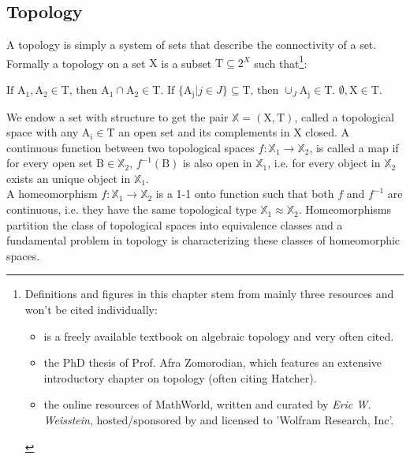 \subsection{Topology}
\label{math_topology}

A topology is simply a system of sets that describe the connectivity of a set.
Formally a topology on a set $\mathrm{X}$ is a subset $\mathrm{T} \subseteq 2^{X}$ such that\footnote{ Definitions and figures in this chapter stem from mainly three resources and won't be cited individually:\begin{itemize}
\item \citep[][]{Hatcher2002} is a freely available textbook on algebraic topology and very often cited.
\item \citep[][]{Zomorodian1996} the PhD thesis of Prof. Afra Zomorodian, which features an extensive introductory chapter on topology (often citing Hatcher).
\item \citep[][]{Weisstein2002} the online resources of MathWorld, written and curated by \textit{Eric W. Weisstein}, hosted/sponsored by and licensed to 'Wolfram Research, Inc'.\end{itemize}}:
\begin{enumerate} \setlength{\itemsep}{0cm} \setlength{\parskip}{0cm}
	\Item $\text{If } \mathrm{A_{1}}, \mathrm{A_{2}} \in \mathrm{T} \text{, then } \mathrm{A_{1}} \cap \mathrm{A_{2}} \in \mathrm{T}.$
	\Item $\text{If } \{\mathrm{A_{j}} | j \in J\} \subseteq \mathrm{T} \text{, then } \cup_{J} \mathrm{A_{j}} \in \mathrm{T}.$
	\Item $\emptyset, \mathrm{X} \in \mathrm{T}.$
\end{enumerate}
We endow a set with structure to get the pair $\mathbb{X} = (\mathrm{X},\mathrm{T})$, called a topological space with any $\mathrm{A}_{i} \in \mathrm{T}$ an open set and its complements in $\mathrm{X}$ closed.
A continuous function between two topological spaces $f: \mathbb{X}_{1} \rightarrow \mathbb{X}_{2}$, is called a map if for every open set $\mathrm{B} \in \mathbb{X}_{2}$, $f^{-1}(\mathrm{B})$ is also open in $\mathbb{X}_{1}$, i.e. for every object in $\mathbb{X}_{2}$ exists an unique object in $\mathbb{X}_{1}$.\\
A homeomorphism $f: \mathbb{X}_{1} \rightarrow \mathbb{X}_{2}$ is a 1-1 onto function such that both $f$ and $f^{-1}$ are continuous, i.e. they have the same topological type $\mathbb{X}_{1} \approx \mathbb{X}_{2}$.
Homeomorphisms partition the class of topological spaces into equivalence classes and a fundamental problem in topology is characterizing these classes of homeomorphic spaces.

